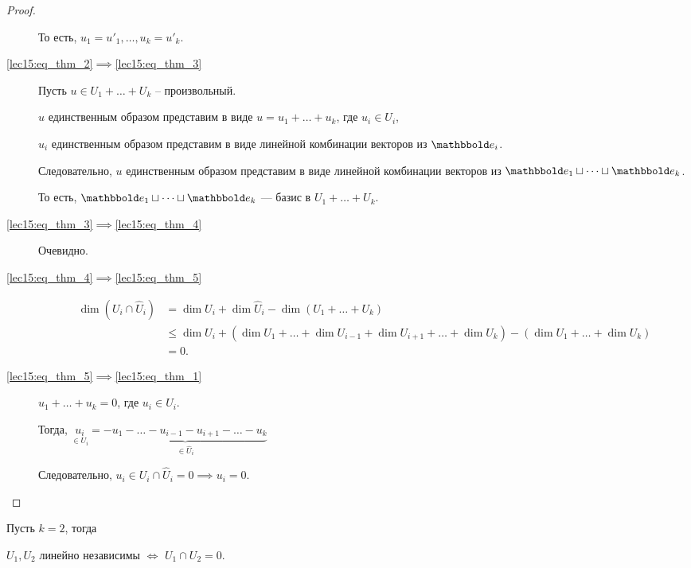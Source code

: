 \documentclass[a4paper]{article}
\begin{document}
\begin{colloq}
\begin{proof}
\begin{description}
                    То есть, $u_1 = u'_1, \dots, u_k = u'_k$.

                \item[\ref{lec15:eq_thm_2}$\implies$\ref{lec15:eq_thm_3}]
                    Пусть $u \in U_1 + \dots + U_k$ -- произвольный.

                    $u$ единственным образом представим в виде $u = u_1 + \dots + u_k$, где $u_i \in U_i$,

                    $u_i$ единственным образом представим в виде линейной комбинации векторов из $\E_i$.
             
                    Следовательно, $u$ единственным образом представим в виде линейной комбинации векторов из $\E_1 \sqcup \dots \sqcup \E_k$.

                    То есть, $\E_1 \sqcup \dots \sqcup \E_k$ --- базис в $U_1 + \dots + U_k$.

                \item[\ref{lec15:eq_thm_3}$\implies$\ref{lec15:eq_thm_4}]
                    Очевидно. 

                \item[\ref{lec15:eq_thm_4}$\implies$\ref{lec15:eq_thm_5}]
                    \begin{align*}
                        \dim (U_i \cap \widehat{U}_i) 
                        &= \dim U_i + \dim \widehat{U}_i - \dim (U_1 + \dots + U_k) \\
                        &\leq \dim U_i + (\dim U_1 + \dots + \dim U_{i - 1} + \dim U_{i + 1} + \dots + \dim U_k) - (\dim U_1 + \dots + \dim U_k) \\
                        &= 0
                    .\end{align*}

                \item[\ref{lec15:eq_thm_5}$\implies$\ref{lec15:eq_thm_1}]
                    $u_1 + \dots + u_k = 0$, где $u_i \in U_i$.

                    Тогда, $\underset{\in U_i}{u_i} = \underbrace{-u_1 - \dots - u_{i - 1} - u_{i + 1} - \dots - u_k}_{\in \widehat{U}_i}$

                    Следовательно, $u_i \in U_i \cap \widehat{U}_i = 0 \implies u_i = 0$.
                    \qedhere
                \end{description}
            \end{proof}

            \begin{corollary}
                Пусть $k = 2$, тогда

                $U_1, U_2$ линейно независимы $\iff$ $U_1 \cap U_2 = 0$.
            \end{corollary}

    \end{colloq}
\end{document}
